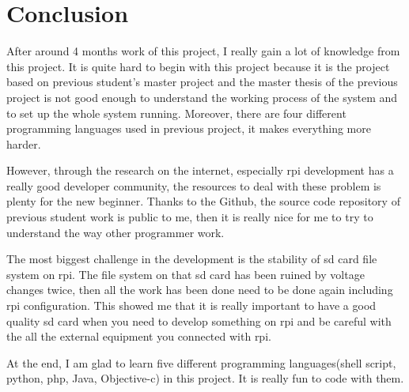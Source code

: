 \chapter{Conclusion}
\label{chp:conclusion}

\par After around 4 months work of this project, I really gain a lot of knowledge from this project. It is quite hard to begin with this project because it is the project based on previous student's master project and the master thesis of the previous project is not good enough to understand the working process of the system and to set up the whole system running. Moreover, there are four different programming languages used in previous project, it makes everything more harder.
\par However, through the research on the internet, especially \gls{rpi} development has a really good developer community, the resources to deal with these problem is plenty for the new beginner. Thanks to the Github, the source code repository of previous student work is public to me, then it is really nice for me to try to understand the way other programmer work.
\par The most biggest challenge in the development is the stability of \gls{sd} card file system on \gls{rpi}. The file system on that \gls{sd} card has been ruined by voltage changes twice, then all the work has been done need to be done again including \gls{rpi} configuration. This showed me that it is really important to have a good quality \gls{sd} card when you need to develop something on \gls{rpi} and be careful with the all the external equipment you connected with \gls{rpi}.
\par At the end, I am glad to learn five different programming languages(shell script, python, \gls{php}, Java, Objective-c) in this project. It is really fun to code with them.